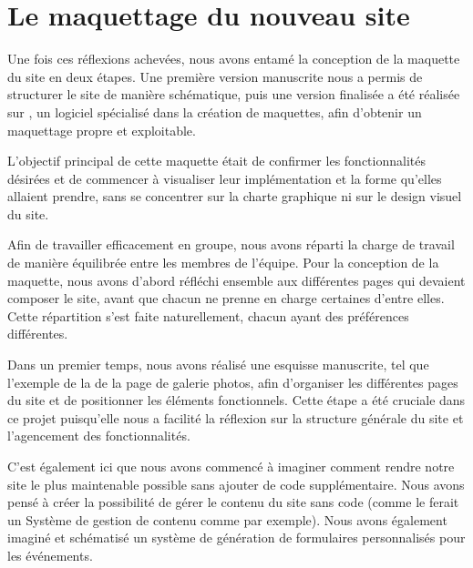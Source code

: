 \section{Le maquettage du nouveau site}

Une fois ces réflexions achevées, nous avons entamé la conception de la maquette du site en deux étapes. Une première version manuscrite nous a permis de structurer le site de manière schématique, puis une version finalisée a été réalisée sur , un logiciel spécialisé dans la création de maquettes, afin d’obtenir un maquettage propre et exploitable.

L'objectif principal de cette maquette était de confirmer les fonctionnalités désirées et de commencer à visualiser leur implémentation et la forme qu'elles allaient prendre, sans se concentrer sur la charte graphique ni sur le design visuel du site.
\bigskip

Afin de travailler efficacement en groupe, nous avons réparti la charge de travail de manière équilibrée entre les membres de l'équipe. Pour la conception de la maquette, nous avons d'abord réfléchi ensemble aux différentes pages qui devaient composer le site, avant que chacun ne prenne en charge certaines d’entre elles. Cette répartition s’est faite naturellement, chacun ayant des préférences différentes.
\bigskip

Dans un premier temps, nous avons réalisé une esquisse manuscrite, tel que l'exemple de la  de la page de galerie photos, afin d’organiser les différentes pages du site et de positionner les éléments fonctionnels. Cette étape a été cruciale dans ce projet puisqu'elle nous a facilité la réflexion sur la structure générale du site et l'agencement des fonctionnalités.

C'est également ici que nous avons commencé à imaginer comment rendre notre site le plus maintenable possible sans ajouter de code supplémentaire. Nous avons pensé à créer la possibilité de gérer le contenu du site sans code (comme le ferait un Système de gestion de contenu comme  par exemple).
Nous avons également imaginé et schématisé un système de génération de formulaires personnalisés pour les événements.

